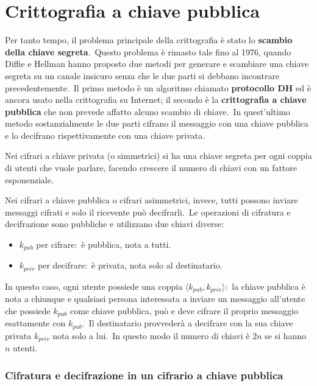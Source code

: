 \section{Crittografia a chiave pubblica}

Per tanto tempo, il problema principale della crittografia è stato lo \textbf{scambio della chiave segreta}.\
Questo problema è rimasto tale fino al 1976, quando Diffie e Hellman hanno proposto due metodi per generare e scambiare una chiave segreta su un canale insicuro senza che le due parti si debbano incontrare precedentemente.\
Il primo metodo è un algoritmo chiamato \textbf{protocollo DH} ed è ancora usato nella crittografia su Internet; il secondo è la \textbf{crittografia a chiave pubblica} che non prevede affatto alcuno scambio di chiave.\
In quest'ultimo metodo sostanzialmente le due parti cifrano il messaggio con una chiave pubblica e lo decifrano rispettivamente con una chiave privata.\

\vspace{12pt}
\noindent Nei cifrari a chiave privata (o simmetrici) si ha una chiave segreta per ogni coppia di utenti che vuole parlare, facendo crescere il numero di chiavi con un fattore esponenziale.
\vspace{12pt}

\noindent Nei cifrari a chiave pubblica o cifrari asimmetrici, invece, tutti possono inviare messaggi cifrati e solo il ricevente può decifrarli.\
Le operazioni di cifratura e decifrazione sono pubbliche e utilizzano due chiavi diverse:
\begin{itemize}
    \item  $k_{\mathit{pub}}$ per cifrare:\ è pubblica, nota a tutti.
    \item  $k_{\mathit{priv}}$ per decifrare:\ è privata, nota solo al destinatario.
\end{itemize}

\noindent In questo caso, ogni utente possiede una coppia $\langle k_{\mathit{pub}}, k_{\mathit{priv}}\rangle$:\ la chiave pubblica è nota a chiunque e qualsiasi persona interessata a inviare un messaggio all'utente che possiede $k_{\mathit{pub}}$ come chiave pubblica, può e deve cifrare il proprio messaggio esattamente con $k_{\mathit{pub}}$.\
Il destinatario provvederà a decifrare con la sua chiave privata $k_{\mathit{priv}}$ nota solo a lui.\
In questo modo il numero di chiavi è $2n$ se si hanno $n$ utenti.

\subsubsection{Cifratura e decifrazione in un cifrario a chiave pubblica}

